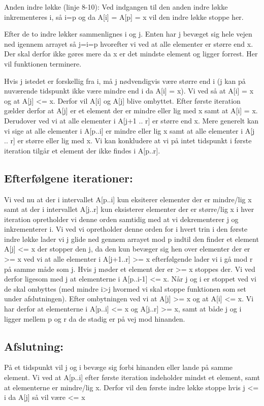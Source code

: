 \documentclass[10pt,a4paper,danish]{article}
\begin{document}
Anden indre løkke (linje 8-10):
Ved indgangen til den anden indre løkke inkrementeres i, så i=p og da A[i] = A[p] = x vil den indre løkke stoppe her.

Efter de to indre løkker sammenlignes i og j.
Enten har j bevæget sig hele vejen ned igennem arrayet så j=i=p hvorefter vi ved at alle elementer er større end x. Der skal derfor ikke gøres mere da x er det mindste element og ligger forrest. Her vil funktionen terminere.

Hvis j istedet er forskellig fra i, må j nødvendigvis være større end i (j kan på nuværende tidspunkt ikke være mindre end i da A[i] = x).
Vi ved så at A[i] = x og at A[j] <= x. Derfor vil A[i] og A[j] blive ombyttet.
Efter første iteration gælder derfor at A[j] er et element der er mindre eller lig med x samt at A[i] = x. Derudover ved vi at alle elementer i A[j+1 .. r] er større end x.
Mere generelt kan vi sige at alle elementer i A[p..i] er mindre eller lig x samt at alle elementer i A[j .. r] er større eller lig med x.
Vi kan konkludere at vi på intet tidspunkt i første iteration tilgår et element der ikke findes i A[p..r].


\subsection{Efterfølgene iterationer:}
\label{sec:eft-it}
Vi ved nu at der i intervallet A[p..i] kun eksiterer elementer der er mindre/lig x samt at der i intervallet A[j..r] kun eksisterer elementer der er større/lig x
i hver iteration opretholder vi denne orden samtidig med at vi dekrementerer j og inkrementerer i.
%
Vi ved vi opretholder denne orden for i hvert trin i den første indre løkke lader vi j glide ned gennem arrayet mod p indtil den finder et element A[j] <= x der stopper den j, da den kun bevæger sig hen over elementer der er >= x ved vi at alle elementer i A[j+1..r] >= x
efterfølgende lader vi i gå mod r på samme måde som j. Hvis j møder et element der er >= x stoppes der. Vi ved derfor ligesom med j at elementerne i A[p..i-1] <= x. Når j og i er stoppet ved vi de skal ombyttes (med mindre  i>j hvormed vi skal stoppe funktionen som set under afslutningen). Efter ombytningen ved vi at A[j] >= x og at A[i] <= x. Vi har derfor at elementerne i A[p..i] <= x og A[j..r] >= x, samt at både j og i ligger mellem p og r da de stadig er på vej mod hinanden.
%
\subsection{Afslutning:}
\label{sec:afsl-it}
På et tidspunkt vil j og i bevæge sig forbi hinanden eller lande på samme element. 
Vi ved at A[p..i] efter første iteration indeholder mindst et element, samt at elementerne er mindre/lig x. Derfor vil den første indre løkke stoppe hvis j <= i da A[j] så vil være <= x
\end{document}
